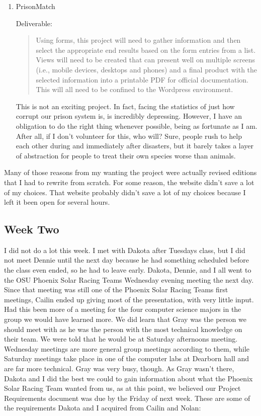 \begin{singlespace}
\begin{enumerate}
	\vspace{0.1in}
    \item PrisonMatch
	
	Deliverable:
	\begin{quote}
    	Using forms, this project will need to gather information and then select the appropriate end results based on the form entries from a list.
    	Views will need to be created that can present well on multiple screens (i.e., mobile devices, desktops and phones) and a final product with the selected information into a printable PDF for official documentation.
    	This will all need to be confined to the Wordpress environment.
	    \cite{PrisonMatch}
	\end{quote}
	
    This is not an exciting project.
    In fact, facing the statistics of just how corrupt our prison system is, is incredibly depressing.
    However, I have an obligation to do the right thing whenever possible, being as fortunate as I am.
    After all, if I don't volunteer for this, who will?
    Sure, people rush to help each other during and immediately after disasters, but it barely takes a layer of abstraction for people to treat their own species worse than animals.
\end{enumerate}
Many of those reasons from my wanting the project were actually revised editions that I had to rewrite from scratch. For some reason, the website didn't save a lot of my choices. That website probably didn't save a lot of my choices because I left it been open for several hours.

\subsection{Week Two}
I did not do a lot this week.
I met with Dakota after Tuesdays class, but I did not meet Dennie until the next day because he had something scheduled before the class even ended, so he had to leave early.
Dakota, Dennie, and I all went to the OSU Phoenix Solar Racing Teams Wednesday evening meeting the next day.
Since that meeting was still one of the Phoenix Solar Racing Teams first meetings, Cailin ended up giving most of the presentation, with very little input.
Had this been more of a meeting for the four computer science majors in the group we would have learned more.
We did learn that Gray was the person we should meet with as he was the person with the most technical knowledge on their team.
We were told that he would be at Saturday afternoons meeting.
Wednesday meetings are more general group meetings according to them, while Saturday meetings take place in one of the computer labs at Dearborn hall and are far more technical.
Gray was very busy, though.
As Gray wasn't there, Dakota and I did the best we could to gain information about what the Phoenix Solar Racing Team wanted from us, as at this point, we believed our Project Requirements document was due by the Friday of next week.
These are some of the requirements Dakota and I acquired from Cailin and Nolan:


\end{singlespace}
